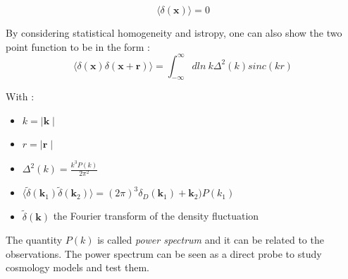 \begin{equation}
\langle \delta (\textbf{x}) \rangle = 0
\end{equation}

By considering statistical homogeneity and istropy, one can also show the two point function to be in the form :
\begin{equation}
\label{Power Spectrum}
\langle \delta (\textbf{x}) \delta (\textbf{x} + \textbf{r}) \rangle = \int^{\infty}_{-\infty} dln \ k \Delta^2 (k) sinc(kr)
\end{equation}

With :
\begin{itemize}
    \item $k = \mid \textbf{k} \mid$
    \item $r = \mid \textbf{r} \mid$
    \item $\Delta^2 (k) = \frac{k^3 P(k)}{2\pi^2}$
    \item $\langle \widetilde{\delta} (\textbf{k}_1) \widetilde{\delta} (\textbf{k}_2) \rangle = (2\pi)^3 \delta_D (\textbf{k}_1) + \textbf{k}_2) P(k_1)$
    \item $\widetilde{\delta} (\textbf{k})$ the Fourier transform of the density fluctuation 
\end{itemize}

The quantity $P(k)$ is called \textit{power spectrum} and it can be related to the observations. The power spectrum can be seen as a direct probe to study cosmology models and test them.









